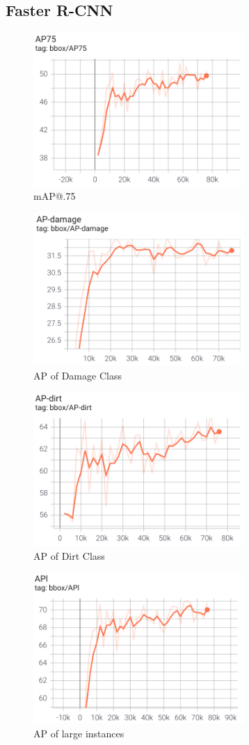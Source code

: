 \documentclass[conference]{IEEEtran}
\begin{document}
\subsection{Faster R-CNN}
\begin{figure}[H]
    \centering
    \includegraphics[width=8cm]{Images/Faster/AP75.png}
    \caption{mAP@.75}
\end{figure}
\begin{figure}[H]
    \centering
    \includegraphics[width=8cm]{Images/Faster/APdamage.png}
    \caption{AP of Damage Class}
\end{figure}
\begin{figure}[H]
    \centering
    \includegraphics[width=8cm]{Images/Faster/APdirt.png}
    \caption{AP of Dirt Class}
\end{figure}
\begin{figure}[H]
    \centering
    \includegraphics[width=8cm]{Images/Faster/APL.png}
    \caption{AP of large instances}
\end{figure}
\end{document}

